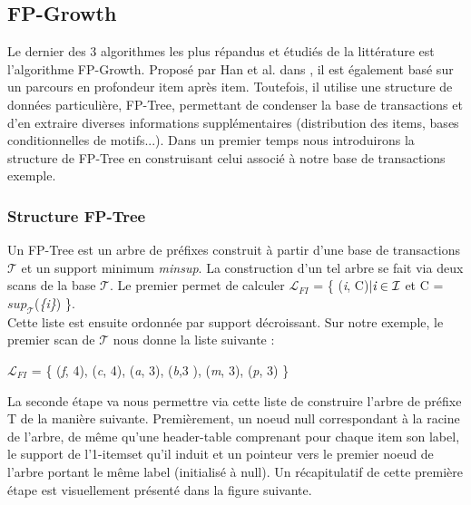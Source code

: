 \documentclass[a4paper,10pt]{report}
\begin{document}
\subsection{FP-Growth}

\hspace{0.15cm}Le dernier des 3 algorithmes les plus répandus et étudiés de la littérature est l'algorithme FP-Growth. Proposé par Han et al. dans \cite{HAN04}, il est également basé sur un parcours en profondeur item après item. Toutefois, il utilise une structure de données particulière, FP-Tree, permettant de condenser la base de transactions et d'en extraire diverses informations supplémentaires (distribution des items, bases conditionnelles de motifs...). Dans un premier temps nous introduirons la structure de FP-Tree en construisant celui associé à notre base de transactions exemple.

\subsubsection{Structure FP-Tree}

\hspace{0.15cm}Un FP-Tree est un arbre de préfixes construit à partir d'une base de transactions $\mathcal{T }$ et un support minimum \emph{minsup}. La construction d'un tel arbre se fait via deux scans de la base $\mathcal{T}$. Le premier permet de calculer $\mathcal{L}_{FI}$ = \{ (\emph{i}, C)$ | \emph{i} \in \mathcal{I}$ et C = \textbf{$sup_{\mathcal{T}}$}(\emph{\{i\}}) \}. \\
Cette liste est ensuite ordonnée par support décroissant. Sur notre exemple, le premier scan de $\mathcal{T}$ nous donne la liste suivante : \\
\begin{center}
	$ \mathcal{L}_{FI}$ = \{ (\emph{f}, 4), (\emph{c}, 4), (\emph{a}, 3), (\emph{b},3 ), (\emph{m}, 3), (\emph{p}, 3) \} \\
\end{center}

La seconde étape va nous permettre via cette liste de construire l'arbre de préfixe T de la manière suivante. Premièrement, un noeud null correspondant à la racine de l'arbre, de même qu'une header-table comprenant pour chaque item son label, le support de l'1-itemset qu'il induit et un pointeur vers le premier noeud de l'arbre portant le même label (initialisé à null). Un récapitulatif de cette première étape est visuellement présenté dans la figure suivante. \\
\end{document}
